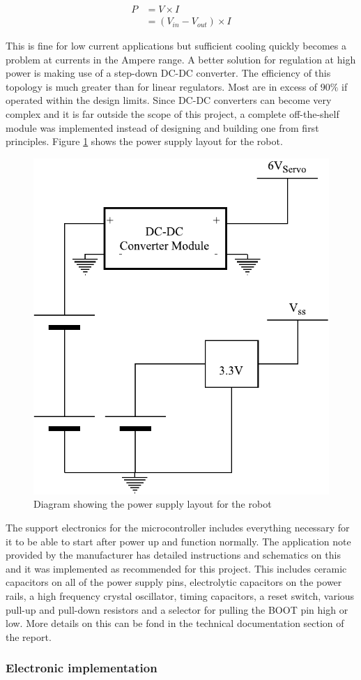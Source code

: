 \begin{align}
P &= V\times I\\
&= (V_{in}-V_{out})\times I
\end{align}

This is fine for low current applications but sufficient cooling quickly becomes a problem at currents in the Ampere range.
A better solution for regulation at high power is making use of a step-down DC-DC converter. The efficiency of this topology is much greater than for linear regulators. Most are in excess of $90\%$ if operated within the design limits. Since DC-DC converters can become very complex and it is far outside the scope of this project, a complete off-the-shelf module was implemented instead of designing and building one from first principles. Figure \ref{fig:PowerSupply} shows the power supply layout for the robot.

\begin{figure}[H]
\centering
\includegraphics[scale = 1]{pics/PowerSupply.pdf}
\caption{Diagram showing the power supply layout for the robot}
\label{fig:PowerSupply}
\end{figure}

The support electronics for the microcontroller includes everything necessary for it to be able to start after power up and function normally. The application note provided by the manufacturer has detailed instructions and schematics on this and it was implemented as recommended for this project. This includes ceramic capacitors on all of the power supply pins, electrolytic capacitors on the power rails, a high frequency crystal oscillator, timing capacitors, a reset switch, various pull-up and pull-down resistors and a selector for pulling the BOOT pin high or low. More details on this can be fond in the technical documentation section of the report.

\subsubsection{Electronic implementation}